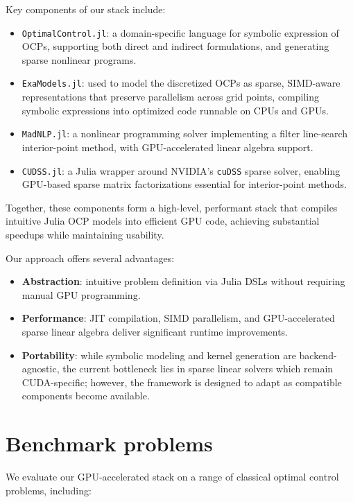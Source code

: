 \documentclass[twoside,leqno,twocolumn]{article}
\begin{document}
Key components of our stack include:

\begin{itemize}
    \item \texttt{OptimalControl.jl}: a domain-specific language for symbolic expression of OCPs, supporting both direct and indirect formulations, and generating sparse nonlinear programs.
    \item \texttt{ExaModels.jl}: used to model the discretized OCPs as sparse, 
    SIMD-aware representations that preserve parallelism across grid points, compiling symbolic expressions into optimized code runnable on CPUs and GPUs.
    \item \texttt{MadNLP.jl}: a nonlinear programming solver implementing a filter line-search interior-point method, with GPU-accelerated linear algebra support.
    \item \texttt{CUDSS.jl}: a Julia wrapper around NVIDIA’s \texttt{cuDSS} sparse solver, enabling GPU-based sparse matrix factorizations essential for interior-point methods.
\end{itemize}

Together, these components form a high-level, performant stack that compiles intuitive Julia OCP models into efficient GPU code, achieving substantial speedups while maintaining usability.

Our approach offers several advantages:

\begin{itemize}
    \item \textbf{Abstraction}: intuitive problem definition via Julia DSLs without requiring manual GPU programming.
    \item \textbf{Performance}: JIT compilation, SIMD parallelism, and GPU-accelerated sparse linear algebra deliver significant runtime improvements.
    \item \textbf{Portability}: while symbolic modeling and kernel generation are backend-agnostic, the current bottleneck lies in sparse linear solvers which remain CUDA-specific; however, the framework is designed to adapt as compatible components become available.
\end{itemize}

\section{Benchmark problems}

We evaluate our GPU-accelerated stack on a range of classical optimal control problems, including:
\end{document}
